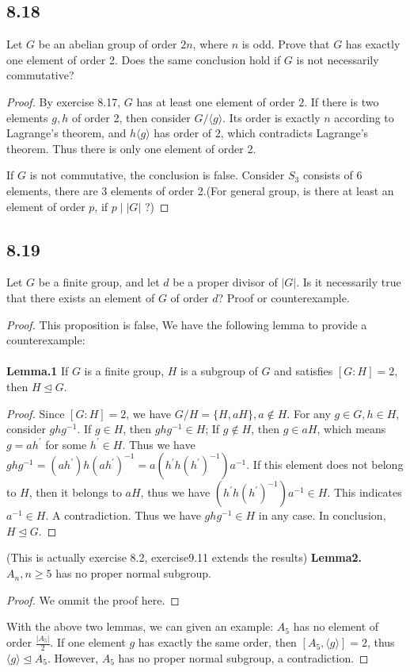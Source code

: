 \documentclass[a4paper, pdf, 12pt]{article}
\begin{document}
\subsection*{8.18}
Let $G$ be an abelian group of order $2n$, where $n$ is odd. Prove that $G$ has
exactly one element of order 2. Does the same conclusion hold if $G$ is not necessarily 
commutative?

\begin{proof}
  By exercise 8.17, $G$ has at least one element of order $2$. If there is two elements $g, h$ of order 2, then 
  consider $G/\langle g \rangle$. Its order is exactly $n$ according to Lagrange’s theorem, and $h\langle g \rangle$
  has order of $2$, which contradicts Lagrange’s theorem. Thus there is only one element of order 2.

  If $G$ is not commutative, the conclusion is false. Consider $S_{3}$ consists of 6 elements, there are 3 elements of 
  order 2.(For general group, is there at least an element of order $p$, if $p\mid \lvert G\rvert$ ?)
\end{proof}

\subsection*{8.19}
Let $G$ be a finite group, and let $d$ be a proper divisor of $\lvert G \rvert$. Is it necessarily
true that there exists an element of $G$ of order $d$? Proof or counterexample.

\begin{proof}
  This proposition is false, We have the following lemma to provide a counterexample:\\
  \\
  \noindent
  \textbf{Lemma.1} If $G$ is a finite group, $H$ is a subgroup of $G$ and satisfies $[G:H] = 2$, then $H\trianglelefteq G$.
  \begin{proof}
    Since $[G:H] = 2$, we have $G/H = \{H, aH\}, a\notin H$. For any $g\in G, h\in H$, consider 
    $ghg^{-1}$. If $g\in H$, then $ghg^{-1}\in H$; If $g\notin H$, then $g\in aH$, which means $g = ah^{'}$ for some $h^{'}\in H$.
    Thus we have $ghg^{-1} = (ah^{'})h(ah^{'})^{-1} = a(h^{'}h(h^{'})^{-1})a^{-1}$. If this element does not belong to $H$, then it belongs to
    $aH$, thus we have $(h^{'}h(h^{'})^{-1})a^{-1}\in H$. This indicates $a^{-1}\in H$. A contradiction. Thus we have 
    $ghg^{-1}\in H$ in any case. In conclusion, $H\trianglelefteq G$.
  \end{proof}
  (This is actually exercise 8.2, exercise9.11 extends the results)
  \noindent 
  \textbf{Lemma2.}
  $A_{n}, n\geq 5$ has no proper normal subgroup.
  \begin{proof}
    We ommit the proof here.
  \end{proof}
  With the above two lemmas, we can given an example: $A_{5}$ has no element of order $\frac{\lvert A_{5}\rvert}{2}$. If one element $g$ has exactly the 
  same order, then $[A_{5}, \langle g \rangle] = 2$, thus $\langle g \rangle \trianglelefteq A_{5}$. However, $A_{5}$ has no proper normal subgroup, a contradiction.
\end{proof}
\end{document}
